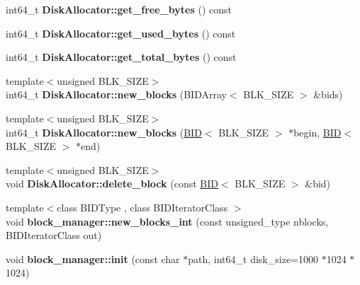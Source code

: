 \begin{CompactItemize}
\item 
\hypertarget{group__mnglayer_gaa40d0bf9d8159e985487e915f158c12}{
int64\_\-t \textbf{DiskAllocator::get\_\-free\_\-bytes} () const }
\label{group__mnglayer_gaa40d0bf9d8159e985487e915f158c12}

\item 
\hypertarget{group__mnglayer_g72de01b131f6350dc7fc04b797cd1742}{
int64\_\-t \textbf{DiskAllocator::get\_\-used\_\-bytes} () const }
\label{group__mnglayer_g72de01b131f6350dc7fc04b797cd1742}

\item 
\hypertarget{group__mnglayer_g640a908464c64439b160cde5b66ae369}{
int64\_\-t \textbf{DiskAllocator::get\_\-total\_\-bytes} () const }
\label{group__mnglayer_g640a908464c64439b160cde5b66ae369}

\item 
\hypertarget{group__mnglayer_g4b4f515090ff0eddafed8ca261e233d0}{
{\footnotesize template$<$unsigned BLK\_\-SIZE$>$ }\\int64\_\-t \textbf{DiskAllocator::new\_\-blocks} (BIDArray$<$ BLK\_\-SIZE $>$ \&bids)}
\label{group__mnglayer_g4b4f515090ff0eddafed8ca261e233d0}

\item 
\hypertarget{group__mnglayer_g1bb810305ba9a4ee9700290b36de77d4}{
{\footnotesize template$<$unsigned BLK\_\-SIZE$>$ }\\int64\_\-t \textbf{DiskAllocator::new\_\-blocks} (\hyperlink{structBID}{BID}$<$ BLK\_\-SIZE $>$ $\ast$begin, \hyperlink{structBID}{BID}$<$ BLK\_\-SIZE $>$ $\ast$end)}
\label{group__mnglayer_g1bb810305ba9a4ee9700290b36de77d4}

\item 
\hypertarget{group__mnglayer_g0b7382450b2ff72620831ae491118038}{
{\footnotesize template$<$unsigned BLK\_\-SIZE$>$ }\\void \textbf{DiskAllocator::delete\_\-block} (const \hyperlink{structBID}{BID}$<$ BLK\_\-SIZE $>$ \&bid)}
\label{group__mnglayer_g0b7382450b2ff72620831ae491118038}

\item 
\hypertarget{group__mnglayer_g36a3a4625156d5b9d17b91ce7e1e1874}{
{\footnotesize template$<$class BIDType , class BIDIteratorClass $>$ }\\void \textbf{block\_\-manager::new\_\-blocks\_\-int} (const unsigned\_\-type nblocks, BIDIteratorClass out)}
\label{group__mnglayer_g36a3a4625156d5b9d17b91ce7e1e1874}

\item 
\hypertarget{group__mnglayer_g9d954d295ff1cb73cffd1075e58d6ab5}{
void \textbf{block\_\-manager::init} (const char $\ast$path, int64\_\-t disk\_\-size=1000 $\ast$1024 $\ast$1024)}
\label{group__mnglayer_g9d954d295ff1cb73cffd1075e58d6ab5}


\end{CompactItemize}
